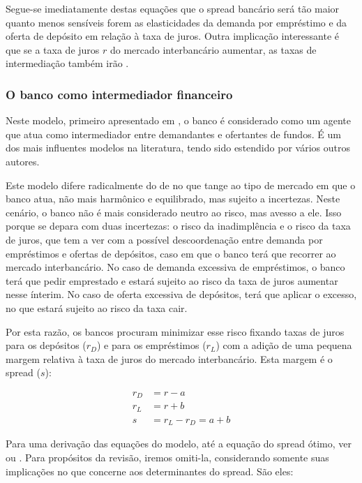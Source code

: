 \documentclass[a4paper,
               article,
               12pt,
               openany,
               oneside,
               english,
               brazil]{abntex2}
\numberwithin{equation}{section}
\begin{document}
    Segue-se imediatamente destas equações que o spread bancário será tão maior quanto menos sensíveis forem as elasticidades da demanda por empréstimo e da oferta de depósito em relação à taxa de juros. Outra implicação interessante é que se a taxa de juros $ r $ do mercado interbancário aumentar, as taxas de intermediação também irão \cite[p.~59]{freixas}.

\subsubsection{O banco como intermediador financeiro}

    Neste modelo, primeiro apresentado em \textcite{hoesaunders}, o banco é considerado como um agente que atua como intermediador entre demandantes e ofertantes de fundos. É um dos mais influentes modelos na literatura, tendo sido estendido por vários outros autores.

    Este modelo difere radicalmente do de \textcite{klein} no que tange ao tipo de mercado em que o banco atua, não mais harmônico e equilibrado, mas sujeito a incertezas. Neste cenário, o banco não é mais considerado neutro ao risco, mas avesso a ele. Isso porque se depara com duas incertezas: o risco da inadimplência e o risco da taxa de juros, que tem a ver com a possível descoordenação entre demanda por empréstimos e ofertas de depósitos, caso em que o banco terá que recorrer ao mercado interbancário. No caso de demanda excessiva de empréstimos, o banco terá que pedir emprestado e estará sujeito ao risco da taxa de juros aumentar nesse ínterim. No caso de oferta excessiva de depósitos, terá que aplicar o excesso, no que estará sujeito ao risco da taxa cair. \textcite[p.~2262]{maudos}

    Por esta razão, os bancos procuram minimizar esse risco fixando taxas de juros para os depósitos ($r_D$) e para os empréstimos ($r_L$) com a adição de uma pequena margem relativa à taxa de juros do mercado interbancário. Esta margem é o spread ($s$):

	\begin{align}
        r_D &= r - a \\
        r_L &= r + b \\
        s &= r_L - r_D = a + b
	\end{align}

    Para uma derivação das equações do modelo, até a equação do spread ótimo, ver \textcite[p.~2262]{maudos} ou \textcite[p.~584]{hoesaunders}. Para propósitos da revisão, iremos omiti-la, considerando somente suas implicações no que concerne aos determinantes do spread. São eles:
\end{document}
